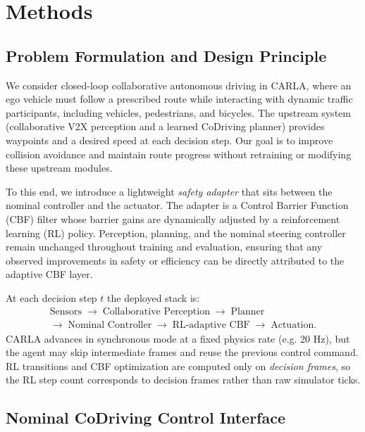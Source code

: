 \section{Methods}
\label{methods}

\subsection{Problem Formulation and Design Principle}

We consider closed-loop collaborative autonomous driving in CARLA, where an ego vehicle must follow a prescribed route while interacting with dynamic traffic participants, including vehicles, pedestrians, and bicycles. The upstream system (collaborative V2X perception and a learned CoDriving planner) provides waypoints and a desired speed at each decision step. Our goal is to improve collision avoidance and maintain route progress without retraining or modifying these upstream modules.

To this end, we introduce a lightweight \emph{safety adapter} that sits between the nominal controller and the actuator. The adapter is a Control Barrier Function (CBF) filter whose barrier gains are dynamically adjusted by a reinforcement learning (RL) policy. Perception, planning, and the nominal steering controller remain unchanged throughout training and evaluation, ensuring that any observed improvements in safety or efficiency can be directly attributed to the adaptive CBF layer.

At each decision step $t$ the deployed stack is:
\begin{equation}
\begin{aligned}
\text{Sensors} \;\rightarrow\; \text{Collaborative Perception} \;\rightarrow\; \text{Planner} \\
\rightarrow\; \text{Nominal Controller} \;\rightarrow\; \text{RL-adaptive CBF} \;\rightarrow\; \text{Actuation}.
\end{aligned}
\end{equation}
CARLA advances in synchronous mode at a fixed physics rate (e.g. 20 Hz), but the agent may skip intermediate frames and reuse the previous control command. RL transitions and CBF optimization are computed only on \emph{decision frames}, so the RL step count corresponds to decision frames rather than raw simulator ticks.

\subsection{Nominal CoDriving Control Interface}

